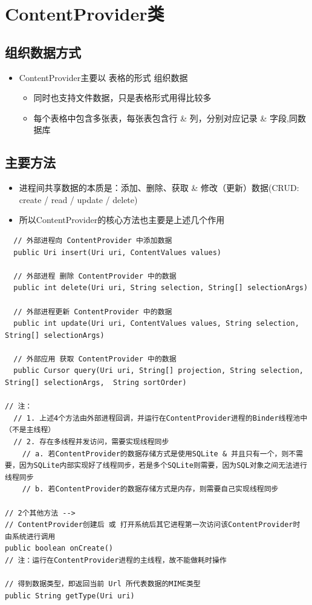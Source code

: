 \documentclass[9pt, b5paaper]{book}
\begin{document}
\section{ContentProvider类}
\label{sec-5-3}
\subsection{组织数据方式}
\label{sec-5-3-1}
\begin{itemize}
\item ContentProvider主要以 表格的形式 组织数据
\begin{itemize}
\item 同时也支持文件数据，只是表格形式用得比较多
\item 每个表格中包含多张表，每张表包含行 \& 列，分别对应记录 \& 字段,同数据库
\end{itemize}
\end{itemize}
\subsection{主要方法}
\label{sec-5-3-2}
\begin{itemize}
\item 进程间共享数据的本质是：添加、删除、获取 \& 修改（更新）数据(CRUD: create / read / update / delete)
\item 所以ContentProvider的核心方法也主要是上述几个作用
\end{itemize}
\begin{verbatim}
  // 外部进程向 ContentProvider 中添加数据
  public Uri insert(Uri uri, ContentValues values) 

  // 外部进程 删除 ContentProvider 中的数据
  public int delete(Uri uri, String selection, String[] selectionArgs) 

  // 外部进程更新 ContentProvider 中的数据
  public int update(Uri uri, ContentValues values, String selection, String[] selectionArgs)

  // 外部应用 获取 ContentProvider 中的数据
  public Cursor query(Uri uri, String[] projection, String selection, String[] selectionArgs,  String sortOrder)　 

// 注：
  // 1. 上述4个方法由外部进程回调，并运行在ContentProvider进程的Binder线程池中（不是主线程）
  // 2. 存在多线程并发访问，需要实现线程同步
    // a. 若ContentProvider的数据存储方式是使用SQLite & 并且只有一个，则不需要，因为SQLite内部实现好了线程同步，若是多个SQLite则需要，因为SQL对象之间无法进行线程同步
    // b. 若ContentProvider的数据存储方式是内存，则需要自己实现线程同步

// 2个其他方法 -->
// ContentProvider创建后 或 打开系统后其它进程第一次访问该ContentProvider时 由系统进行调用
public boolean onCreate() 
// 注：运行在ContentProvider进程的主线程，故不能做耗时操作

// 得到数据类型，即返回当前 Url 所代表数据的MIME类型
public String getType(Uri uri)
\end{verbatim}
\end{document}

